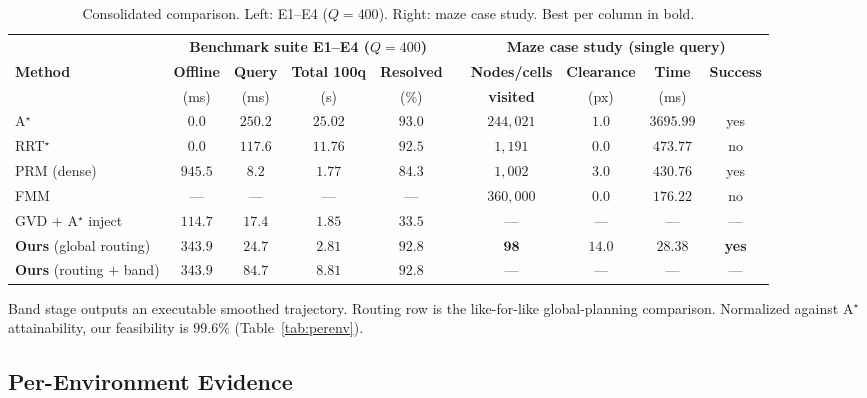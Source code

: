 \documentclass[conference]{IEEEtran}
\begin{document}
\begin{table}[htbp]
\caption{Consolidated comparison. Left: E1--E4 ($Q=400$). Right: maze case study. Best per column in bold.}
\label{tab:master}
\begin{center}
\begin{tabular}{@{}l cccc c cccc@{}}
\toprule
& \multicolumn{4}{c}{\textbf{Benchmark suite E1--E4 ($Q=400$)}} & & \multicolumn{4}{c}{\textbf{Maze case study (single query)}} \\
\cmidrule(lr){2-5} \cmidrule(lr){7-10}
\textbf{Method} & \textbf{Offline} & \textbf{Query} & \textbf{Total 100q} & \textbf{Resolved} & & \textbf{Nodes/cells} & \textbf{Clearance} & \textbf{Time} & \textbf{Success} \\
 & (ms) & (ms) & (s) & (\%) & & \textbf{visited} & (px) & (ms) & \\ \midrule
A$^\star$~\cite{hart1968}              & $\mathbf{0.0}$ & $250.2$ & $25.02$ & $\mathbf{93.0}$ & & $244{,}021$ & $1.0$ & $3695.99$ & yes \\
RRT$^\star$~\cite{karaman2011}         & $\mathbf{0.0}$ & $117.6$ & $11.76$ & $92.5$ & & $1{,}191$ & $0.0$ & $473.77$ & no \\
PRM (dense)~\cite{kavraki1996}         & $945.5$ & $\mathbf{8.2}$ & $1.77$ & $84.3$ & & $1{,}002$ & $3.0$ & $430.76$ & yes \\
FMM                                    & --- & --- & --- & --- & & $360{,}000$ & $0.0$ & $176.22$ & no \\
GVD + A$^\star$ inject                 & $114.7$ & $17.4$ & $1.85$ & $33.5$ & & --- & --- & --- & --- \\ \midrule
\textbf{Ours} (global routing)         & $343.9$ & $24.7$ & $\mathbf{2.81}$ & $92.8$ & & $\mathbf{98}$ & $\mathbf{14.0}$ & $\mathbf{28.38}$ & \textbf{yes} \\
\textbf{Ours} (routing $+$ band)       & $343.9$ & $84.7$ & $8.81$ & $92.8$ & & --- & --- & --- & --- \\ \bottomrule
\end{tabular}
\end{center}
\footnotesize Band stage outputs an executable smoothed trajectory. Routing row is the like-for-like global-planning comparison. Normalized against A$^\star$ attainability, our feasibility is $99.6\%$ (Table~\ref{tab:perenv}).
\end{table}

\subsection{Per-Environment Evidence}
\end{document}

